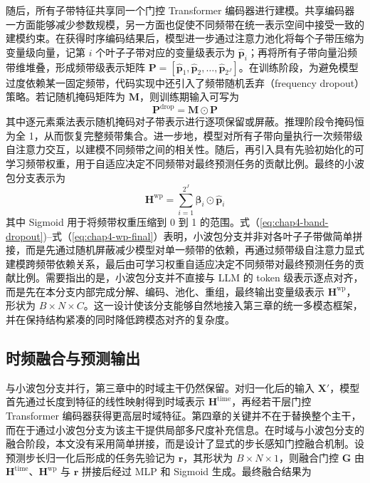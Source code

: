 随后，所有子带特征共享同一个门控 Transformer 编码器进行建模。共享编码器一方面能够减少参数规模，另一方面也促使不同频带在统一表示空间中接受一致的建模约束。在获得时序编码结果后，模型进一步通过注意力池化将每个子带压缩为变量级向量，记第 $i$ 个叶子子带对应的变量级表示为 $\hat{\mathbf{p}}_i$；再将所有子带向量沿频带维堆叠，形成频带级表示矩阵 $\mathbf{P}=[\hat{\mathbf{p}}_1,\hat{\mathbf{p}}_2,\dots,\hat{\mathbf{p}}_{2^J}]$。在训练阶段，为避免模型过度依赖某一固定频带，代码实现中还引入了频带随机丢弃（frequency dropout）策略\cite{srivastava2014dropout}。若记随机掩码矩阵为 $\mathbf{M}$，则训练期输入可写为
\begin{equation}
\mathbf{P}^{\mathrm{drop}}=\mathbf{M}\odot \mathbf{P}
\label{eq:chap4-band-dropout}
\end{equation}
其中逐元素乘法表示随机掩码对子带表示进行逐项保留或屏蔽。推理阶段令掩码恒为全 1，从而恢复完整频带集合。进一步地，模型对所有子带向量执行一次频带级自注意力交互，以建模不同频带之间的相关性。随后，再引入具有先验初始化的可学习频带权重，用于自适应决定不同频带对最终预测任务的贡献比例。最终的小波包分支表示为
\begin{equation}
\mathbf{H}^{\mathrm{wp}}
=\sum_{i=1}^{2^J}\boldsymbol{\beta}_i\odot \hat{\mathbf{p}}_i
\label{eq:chap4-wp-final}
\end{equation}
其中 Sigmoid 用于将频带权重压缩到 0 到 1 的范围。式（\ref{eq:chap4-band-dropout})--式（\ref{eq:chap4-wp-final}）表明，小波包分支并非对各叶子子带做简单拼接，而是先通过随机屏蔽减少模型对单一频带的依赖，再通过频带级自注意力显式建模跨频带依赖关系，最后由可学习权重自适应决定不同频带对最终预测任务的贡献比例。需要指出的是，小波包分支并不直接与 LLM 的 token 级表示逐点对齐，而是先在本分支内部完成分解、编码、池化、重组，最终输出变量级表示 $\mathbf{H}^{\mathrm{wp}}$，形状为 $B\times N\times C$。这一设计使该分支能够自然地接入第三章的统一多模态框架，并在保持结构紧凑的同时降低跨模态对齐的复杂度。 \subsection{时频融合与预测输出} 与小波包分支并行，第三章中的时域主干仍然保留。对归一化后的输入 $\mathbf{X}'$，模型首先通过长度到特征的线性映射得到时域表示 $\mathbf{H}^{\mathrm{time}}$，再经若干层门控 Transformer 编码器获得更高层时域特征。第四章的关键并不在于替换整个主干，而在于通过小波包分支为该主干提供局部多尺度补充信息。在时域与小波包分支的融合阶段，本文没有采用简单拼接，而是设计了显式的步长感知门控融合机制。设预测步长归一化后形成的任务先验记为 $\mathbf{r}$，其形状为 $B\times N\times 1$，则融合门控 $\mathbf{G}$ 由 $\mathbf{H}^{\mathrm{time}}$、$\mathbf{H}^{\mathrm{wp}}$ 与 $\mathbf{r}$ 拼接后经过 MLP 和 Sigmoid 生成。最终融合结果为
